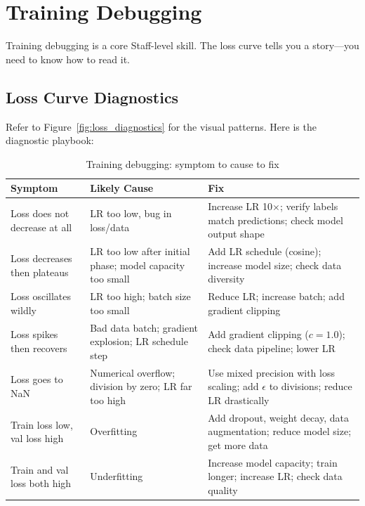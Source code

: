 \section{Training Debugging}
\label{sec:training_debug}

Training debugging is a core Staff-level skill. The loss curve tells you a story---you need to know how to read it.

\subsection{Loss Curve Diagnostics}

Refer to Figure~\ref{fig:loss_diagnostics} for the visual patterns. Here is the diagnostic playbook:

\begin{table}[H]
\centering
\caption{Training debugging: symptom to cause to fix}
\begin{tabularx}{\textwidth}{lXX}
\toprule
\textbf{Symptom} & \textbf{Likely Cause} & \textbf{Fix} \\
\midrule
Loss does not decrease at all & LR too low, bug in loss/data & Increase LR 10$\times$; verify labels match predictions; check model output shape \\
Loss decreases then plateaus & LR too low after initial phase; model capacity too small & Add LR schedule (cosine); increase model size; check data diversity \\
Loss oscillates wildly & LR too high; batch size too small & Reduce LR; increase batch; add gradient clipping \\
Loss spikes then recovers & Bad data batch; gradient explosion; LR schedule step & Add gradient clipping ($c = 1.0$); check data pipeline; lower LR \\
Loss goes to NaN & Numerical overflow; division by zero; LR far too high & Use mixed precision with loss scaling; add $\epsilon$ to divisions; reduce LR drastically \\
Train loss low, val loss high & Overfitting & Add dropout, weight decay, data augmentation; reduce model size; get more data \\
Train and val loss both high & Underfitting & Increase model capacity; train longer; increase LR; check data quality \\
\bottomrule
\end{tabularx}
\end{table}

